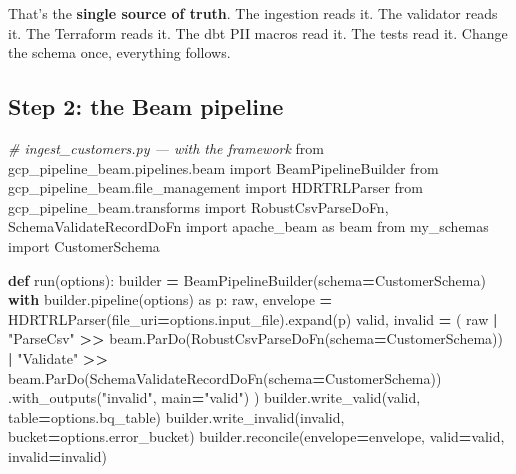 \documentclass[
  11pt,
  british,
  oneside]{book}
\newenvironment{Shaded}{\begin{snugshade}}{\end{snugshade}}
\newcommand{\CommentTok}[1]{\textcolor[rgb]{0.56,0.35,0.01}{\textit{#1}}}
\newcommand{\ControlFlowTok}[1]{\textcolor[rgb]{0.13,0.29,0.53}{\textbf{#1}}}
\newcommand{\ImportTok}[1]{#1}
\newcommand{\KeywordTok}[1]{\textcolor[rgb]{0.13,0.29,0.53}{\textbf{#1}}}
\newcommand{\NormalTok}[1]{#1}
\newcommand{\OperatorTok}[1]{\textcolor[rgb]{0.81,0.36,0.00}{\textbf{#1}}}
\newcommand{\StringTok}[1]{\textcolor[rgb]{0.31,0.60,0.02}{#1}}
\begin{document}
That's the \textbf{single source of truth}. The ingestion reads it. The
validator reads it. The Terraform reads it. The dbt PII macros read it.
The tests read it. Change the schema once, everything follows.

\hypertarget{step-2-the-beam-pipeline}{%
\subsection{Step 2: the Beam pipeline}\label{step-2-the-beam-pipeline}}

\begin{Shaded}
\begin{Highlighting}[]
\CommentTok{\# ingest\_customers.py  — with the framework}
\ImportTok{from}\NormalTok{ gcp\_pipeline\_beam.pipelines.beam }\ImportTok{import}\NormalTok{ BeamPipelineBuilder}
\ImportTok{from}\NormalTok{ gcp\_pipeline\_beam.file\_management }\ImportTok{import}\NormalTok{ HDRTRLParser}
\ImportTok{from}\NormalTok{ gcp\_pipeline\_beam.transforms }\ImportTok{import}\NormalTok{ RobustCsvParseDoFn, SchemaValidateRecordDoFn}
\ImportTok{import}\NormalTok{ apache\_beam }\ImportTok{as}\NormalTok{ beam}
\ImportTok{from}\NormalTok{ my\_schemas }\ImportTok{import}\NormalTok{ CustomerSchema}

\KeywordTok{def}\NormalTok{ run(options):}
\NormalTok{    builder }\OperatorTok{=}\NormalTok{ BeamPipelineBuilder(schema}\OperatorTok{=}\NormalTok{CustomerSchema)}
    \ControlFlowTok{with}\NormalTok{ builder.pipeline(options) }\ImportTok{as}\NormalTok{ p:}
\NormalTok{        raw, envelope }\OperatorTok{=}\NormalTok{ HDRTRLParser(file\_uri}\OperatorTok{=}\NormalTok{options.input\_file).expand(p)}
\NormalTok{        valid, invalid }\OperatorTok{=}\NormalTok{ (}
\NormalTok{            raw}
            \OperatorTok{|} \StringTok{"ParseCsv"} \OperatorTok{\textgreater{}\textgreater{}}\NormalTok{ beam.ParDo(RobustCsvParseDoFn(schema}\OperatorTok{=}\NormalTok{CustomerSchema))}
            \OperatorTok{|} \StringTok{"Validate"} \OperatorTok{\textgreater{}\textgreater{}}\NormalTok{ beam.ParDo(SchemaValidateRecordDoFn(schema}\OperatorTok{=}\NormalTok{CustomerSchema))}
\NormalTok{                               .with\_outputs(}\StringTok{"invalid"}\NormalTok{, main}\OperatorTok{=}\StringTok{"valid"}\NormalTok{)}
\NormalTok{        )}
\NormalTok{        builder.write\_valid(valid, table}\OperatorTok{=}\NormalTok{options.bq\_table)}
\NormalTok{        builder.write\_invalid(invalid, bucket}\OperatorTok{=}\NormalTok{options.error\_bucket)}
\NormalTok{        builder.reconcile(envelope}\OperatorTok{=}\NormalTok{envelope, valid}\OperatorTok{=}\NormalTok{valid, invalid}\OperatorTok{=}\NormalTok{invalid)}
\end{Highlighting}
\end{Shaded}
\end{document}
